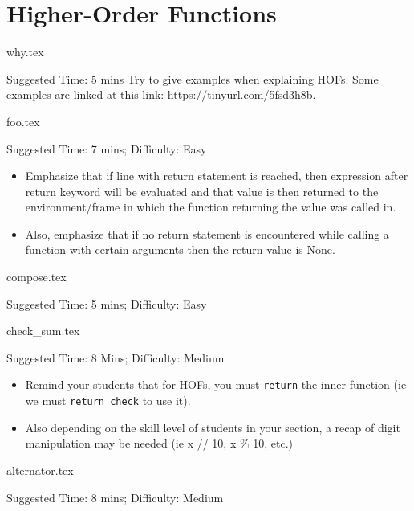 \documentclass{exam}
\begin{document}
\section{Higher-Order Functions}
\begin{questions}
    {why.tex}
    \begin{questionmeta}
        Suggested Time: 5 mins
        Try to give examples when explaining HOFs. Some examples are linked at this link: \url{https://tinyurl.com/5fsd3h8b}.
    \end{questionmeta}
    {foo.tex}
    \begin{questionmeta}
        Suggested Time: 7 mins; Difficulty: Easy
        \begin{itemize}
            \item Emphasize that if line with return statement is reached, then expression after return keyword will be evaluated and that value is then returned to the environment/frame in which the function returning the value was called in. 
            \item Also, emphasize that if no return statement is encountered while calling a function with certain arguments then the return value is None.
        \end{itemize}
    \end{questionmeta}
    {compose.tex}
    \begin{questionmeta}
        Suggested Time: 5 mins; Difficulty: Easy
    \end{questionmeta}
    {check_sum.tex}
    \begin{questionmeta}
        Suggested Time: 8 Mins; Difficulty: Medium
        \begin{itemize}
            \item Remind your students that for HOFs, you must \lstinline{return} the inner function (ie we must \lstinline{return check} to use it).
            \item Also depending on the skill level of students in your section, a recap of digit manipulation may be needed (ie x // 10, x \% 10, etc.)
        \end{itemize}
    \end{questionmeta}
    {alternator.tex}
    \begin{questionmeta}
        Suggested Time: 8 mins; Difficulty: Medium
        \begin{itemize}

\end{itemize}
\end{questionmeta}
\end{questions}
\end{document}
